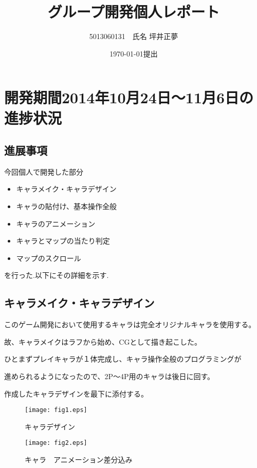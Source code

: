 \documentclass{jarticle}
\title{グループ開発個人レポート}
\author{5013060131　氏名 坪井正夢}
\date{\today 提出}
\begin{document}
\maketitle

\section{開発期間2014年10月24日〜11月6日の進捗状況}
\subsection{進展事項}
今回個人で開発した部分
\begin{itemize}
  \item キャラメイク・キャラデザイン
  \item キャラの貼付け、基本操作全般
  \item キャラのアニメーション
  \item キャラとマップの当たり判定
  \item マップのスクロール
\end{itemize}
を行った.以下にその詳細を示す.

\subsection{キャラメイク・キャラデザイン}
このゲーム開発において使用するキャラは完全オリジナルキャラを使用する。

故、キャラメイクはラフから始め、CGとして描き起こした。

ひとまずプレイキャラが１体完成し、キャラ操作全般のプログラミングが

進められるようになったので、2P〜4P用のキャラは後日に回す。

作成したキャラデザインを最下に添付する。


\begin{figure}[hb]
\begin{minipage}{0.5\hsize}
\begin{center}
\texttt{[image: fig1.eps]}
\caption{キャラデザイン}
\end{center}
\end{minipage}
\begin{minipage}{0.5\hsize}
\begin{center}
\texttt{[image: fig2.eps]}
\caption{キャラ　アニメーション差分込み}
\end{center}
\end{minipage}
\end{figure}
\end{document}
